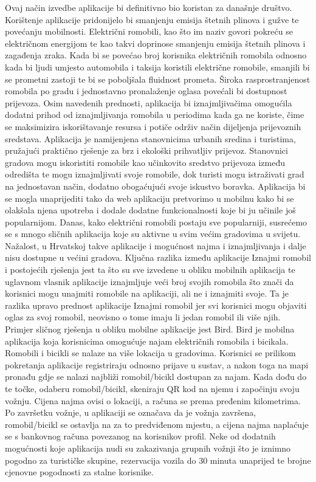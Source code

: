 		Ovaj način izvedbe aplikacije bi definitivno bio koristan za današnje društvo. Korištenje aplikacije pridonijelo bi smanjenju emisija štetnih plinova i gužve te povećanju mobilnosti. Električni romobili, kao što im naziv govori pokreću se električnom energijom te kao takvi doprinose smanjenju emisija štetnih plinova i zagađenja zraka. Kada bi se povećao broj korisnika električnih romobila odnosno kada bi ljudi umjesto automobila i taksija koristili električne romobile, smanjili bi se prometni zastoji te bi se poboljšala fluidnost prometa. Široka rasprostranjenost romobila po gradu i jednostavno pronalaženje oglasa povećali bi dostupnost prijevoza. Osim navedenih prednosti, aplikacija bi iznajmljivačima omogućila dodatni prihod od iznajmljivanja romobila u periodima kada ga ne koriste, čime se maksimizira iskorištavanje resursa i potiče održiv način dijeljenja prijevoznih sredstava. Aplikacija je namijenjena stanovnicima urbanih sredina i turistima, pružajući praktično rješenje za brz i ekološki prihvatljiv prijevoz. Stanovnici gradova mogu iskoristiti romobile kao učinkovito sredstvo prijevoza između odredišta te mogu iznajmljivati svoje romobile, dok turisti mogu istraživati grad na jednostavan način, dodatno obogaćujući svoje iskustvo boravka. Aplikacija bi se mogla unaprijediti tako da web aplikaciju pretvorimo u mobilnu kako bi se olakšala njena upotreba i dodale dodatne funkcionalnosti koje bi ju učinile još popularnijom.  
		\newline
		\newline
		Danas, kako električni romobili postaju sve popularniji, susrećemo se s mnogo sličnih aplikacija koje su aktivne u svim većim gradovima u svijetu. Nažalost, u Hrvatskoj takve aplikacije i mogućnost najma i iznajmljivanja i dalje nisu dostupne u većini gradova. Ključna razlika između aplikacije Iznajmi romobil i postojećih rješenja jest ta što su sve izvedene u obliku mobilnih aplikacija te uglavnom vlasnik aplikacije iznajmljuje veći broj svojih romobila što znači da korisnici mogu unajmiti romobile na aplikaciji, ali ne i iznajmiti svoje. Ta je razlika upravo prednost aplikacije Iznajmi romobil jer svi korisnici mogu objaviti oglas za svoj romobil, neovisno o tome imaju li jedan romobil ili više njih. Primjer sličnog rješenja u obliku mobilne aplikacije jest Bird. Bird je mobilna aplikacija koja korisnicima omogućuje najam električnih romobila i bicikala. Romobili i bicikli se nalaze na više lokacija u gradovima. Korisnici se prilikom pokretanja aplikacije registriraju odnosno prijave u sustav, a nakon toga na mapi pronađu gdje se nalazi najbliži romobil/bicikl dostupan za najam. Kada dođu do te točke, odaberu romobil/bicikl, skeniraju QR kod na njemu i započinju svoju vožnju. Cijena najma ovisi o lokaciji, a računa se prema pređenim kilometrima. Po završetku vožnje, u aplikaciji se označava da je vožnja završena, romobil/bicikl se ostavlja na za to predviđenom mjestu, a cijena najma naplaćuje se s bankovnog računa povezanog na korisnikov profil. Neke od dodatnih mogućnosti koje aplikacija nudi su zakazivanja grupnih vožnji što je iznimno pogodno za turističke skupine, rezervacija vozila do 30 minuta unaprijed te brojne cjenovne pogodnosti za stalne korisnike.
		
